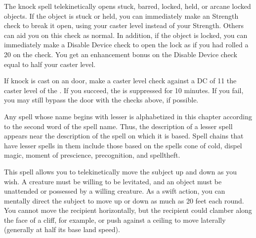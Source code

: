 \begin{comment}
\subsubsection{J-L}
\end{comment}

\begin{spelleffect}
    The knock spell telekinetically opens stuck, barred, locked, held, or arcane locked objects. If the object is stuck or held, you can immediately make an Strength check to break it open, using your caster level instead of your Strength. Others can aid you on this check as normal. In addition, if the object is locked, you can immediately make a Disable Device check to open the lock as if you had rolled a 20 on the check. You get an enhancement bonus on the Disable Device check equal to half your caster level.
\end{spelleffect}
\begin{spellnotes}
    If knock is cast on an  door, make a caster level check against a DC of 11 \add the caster level of the . If you succeed, the  is suppressed for 10 minutes. If you fail, you may still bypass the door with the checks above, if possible.
\end{spellnotes}

\par Any spell whose name begins with lesser is alphabetized in this chapter according to the second word of the spell name. Thus, the description of a lesser spell appears near the description of the spell on which it is based. Spell chains that have lesser spells in them include those based on the spells cone of cold, dispel magic, moment of prescience, precognition, and spelltheft.

\spelldur{\durshort \dismissable}
\begin{spelleffect}
    This spell allows you to telekinetically move the subject up and down as you wish. A creature must be willing to be levitated, and an object must be unattended or possessed by a willing creature. As a swift action, you can mentally direct the subject to move up or down as much as 20 feet each round. You cannot move the recipient horizontally, but the recipient could clamber along the face of a cliff, for example, or push against a ceiling to move laterally (generally at half its base land speed).
\end{spelleffect}

